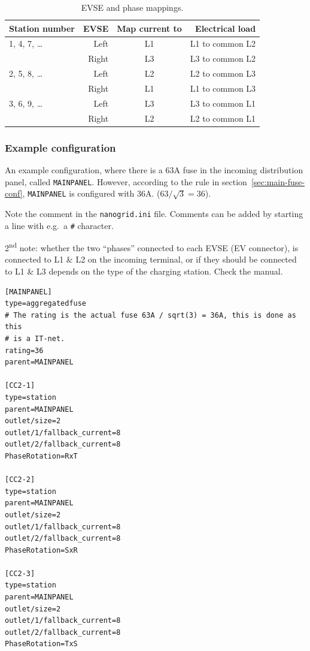 \documentclass[10pt,a4paper,oneside,headings=big,headsepline]{scrreprt}
\begin{document}
\begin{table}[htbp]
  \caption{EVSE and phase mappings.}
  \label{tab:evse-phase-mappings}
  \begin{tabular}{lrcr}
    \toprule
    Station number &  EVSE & Map current to & Electrical load \\
    \midrule
    1, 4, 7, \ldots & Left  & L1 & L1 to common L2 \\
                    & Right & L3 & L3 to common L2 \\
    \midrule
    2, 5, 8, \ldots & Left  &  L2 & L2 to common L3 \\
                    & Right &  L1 & L1 to common L3 \\
    \midrule
    3, 6, 9, \ldots & Left  &  L3 &  L3 to common L1 \\
                    & Right &  L2 & L2 to common L1 \\
    \bottomrule
  \end{tabular}
\end{table}

\subsubsection{Example configuration}
\label{sec:example-conf}

An example configuration, where there is a 63A fuse in the incoming
distribution panel, called \verb|MAINPANEL|. However, according to the rule in
section~\ref{sec:main-fuse-conf}, \verb|MAINPANEL| is configured with
36A. ($63 / \sqrt{3} = 36$).

Note the comment in the \verb|nanogrid.ini| file. Comments can be added by
starting a line with e.g.\ a \verb|#| character.

2\textsuperscript{nd} note: whether the two ``phases'' connected to each EVSE
(EV connector), is connected to L1 \& L2 on the incoming terminal, or if they
should be connected to L1 \& L3 depends on the type of the charging
station. Check the manual.

\begin{verbatim}
[MAINPANEL]
type=aggregatedfuse
# The rating is the actual fuse 63A / sqrt(3) = 36A, this is done as this
# is a IT-net.
rating=36
parent=MAINPANEL

[CC2-1]
type=station
parent=MAINPANEL
outlet/size=2
outlet/1/fallback_current=8
outlet/2/fallback_current=8
PhaseRotation=RxT

[CC2-2]
type=station
parent=MAINPANEL
outlet/size=2
outlet/1/fallback_current=8
outlet/2/fallback_current=8
PhaseRotation=SxR

[CC2-3]
type=station
parent=MAINPANEL
outlet/size=2
outlet/1/fallback_current=8
outlet/2/fallback_current=8
PhaseRotation=TxS
\end{verbatim}
\end{document}

